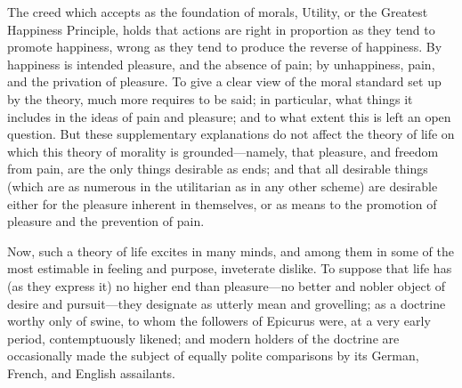 \documentclass[12pt]{report}
\begin{document}
The creed which accepts as the foundation of morals, Utility, or the Greatest Happiness Principle, holds that actions are right in proportion as they tend to promote happiness, wrong as they tend to produce the reverse of happiness. By happiness is intended pleasure, and the absence of pain; by unhappiness, pain, and the privation of pleasure. To give a clear view of the moral standard set up by the theory, much more requires to be said; in particular, what things it includes in the ideas of pain and pleasure; and to what extent this is left an open question. But these supplementary explanations do not affect the theory of life on which this theory of morality is grounded—namely, that pleasure, and freedom from pain, are the only things desirable as ends; and that all desirable things (which are as numerous in the utilitarian as in any other scheme) are desirable either for the pleasure inherent in themselves, or as means to the promotion of pleasure and the prevention of pain.

Now, such a theory of life excites in many minds, and among them in some of the most estimable in feeling and purpose, inveterate dislike. To suppose that life has (as they express it) no higher end than pleasure—no better and nobler object of desire and pursuit—they designate as utterly mean and grovelling; as a doctrine worthy only of swine, to whom the followers of Epicurus were, at a very early period, contemptuously likened; and modern holders of the doctrine are occasionally made the subject of equally polite comparisons by its German, French, and English assailants.
\end{document}
